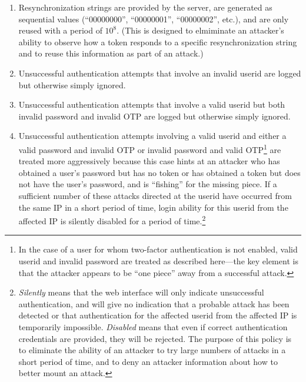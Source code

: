 \begin{enumerate}
\item Resynchronization strings are provided by the server, are generated
      as sequential values (``00000000'', ``00000001'', ``00000002'', etc.),
      and are only reused with a period of $10^8$.  (This is designed to
      elmiminate an attacker's ability to observe how a token responds to
      a specific resynchronization string and to reuse this information as
      part of an attack.)
\item Unsuccessful authentication attempts that involve an invalid userid
      are logged but otherwise simply ignored.
\item Unsuccessful authentication attempts that involve a valid userid but 
      both invalid password and invalid OTP are logged but otherwise
      simply ignored.
\item Unsuccessful authentication attempts involving a valid userid and
      either a valid password and invalid OTP or invalid password and valid
      OTP\footnote{In the case of a user for whom two-factor authentication
      is not enabled, valid userid and invalid password are treated as described
      here---the key element is that the attacker appears to be ``one piece''
      away from a successful attack.} 
      are treated more aggressively because this case hints at an attacker
      who has obtained a user's password but has no token or has obtained a token
      but does not have the user's password, and is ``fishing'' for the missing
      piece.  If a sufficient number of these attacks directed at the userid have
      occurred from the same IP in a short period of time, login ability for
      this userid from the affected IP is silently disabled for a period of 
      time.\footnote{\emph{Silently} means that the web interface will only indicate
      unsuccessful authentication, and will give no indication that a probable attack
      has been detected or that authentication for the affected userid from the 
      affected IP is temporarily impossible.  \emph{Disabled} means that even if
      correct authentication credentials are provided, they will be rejected.  The
      purpose of this policy is to eliminate the ability of an attacker to try large
      numbers of attacks in a short period of time, and to deny an attacker information
      about how to better mount an attack.} 
\end{enumerate}


